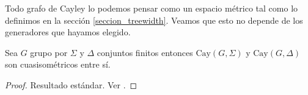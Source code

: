 \documentclass[tesis.tex]{subfiles}
\begin{document}
Todo grafo de Cayley lo podemos pensar como un espacio métrico tal como lo definimos en la sección \ref{seccion_treewidth}.  
Veamos que esto no depende de los generadores que hayamos elegido.

\begin{prop}
	Sea $G$ grupo \fg por $\Sigma$ y $\Delta$ conjuntos finitos entonces $\text{Cay}(G,\Sigma)$ y $\text{Cay}(G, \Delta)$ son cuasisométricos entre sí.
\end{prop}

\begin{proof}
	Resultado estándar. Ver \cite{bridson2013metric}.
\end{proof}


%	
\end{document}
